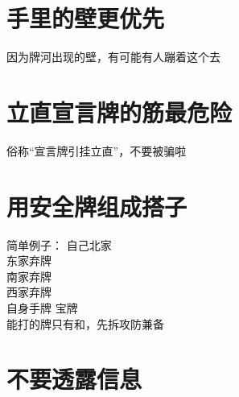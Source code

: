 \documentclass[小V的日麻笔记.tex]{subfiles}
\begin{document}
\section{手里的壁更优先}
因为牌河出现的壁，有可能有人蹦着这个去

\section{立直宣言牌的筋最危险}
俗称“宣言牌引挂立直”，不要被骗啦~

\section{用安全牌组成搭子}
简单例子：
自己北家\\
东家弃牌 \\
南家弃牌 \\
西家弃牌 \\
自身手牌  宝牌 \\
能打的牌只有和，先拆攻防兼备

\section{不要透露信息}
\end{document}
